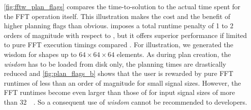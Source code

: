 \cref{fig:fftw_plan_flags} compares the time-to-solution to the actual time spent for the FFT operation itself. This illustration makes the cost and the benefit of higher planning flags than  obvious.  imposes a total runtime penalty of 1 to 2 orders of magnitude with respect to , but it offers superior performance if limited to pure FFT execution timings compared . For illustration, we generated the wisdom for shapes up to $64\times64\times64$ elements. As during plan creation, the \emph{wisdom} has to be loaded from disk only, the planning times are drastically reduced and \cref{fig:plan_flags_b} shows that the user is rewarded by pure FFT runtimes of less than an order of magnitude for small signal sizes. However, the FFT runtimes become even larger than those of  for input signal sizes of more than \SI{32}{\kibi\byte}. So a consequent use of \fftw{} \emph{wisdom} cannot be recommended to developers. 

